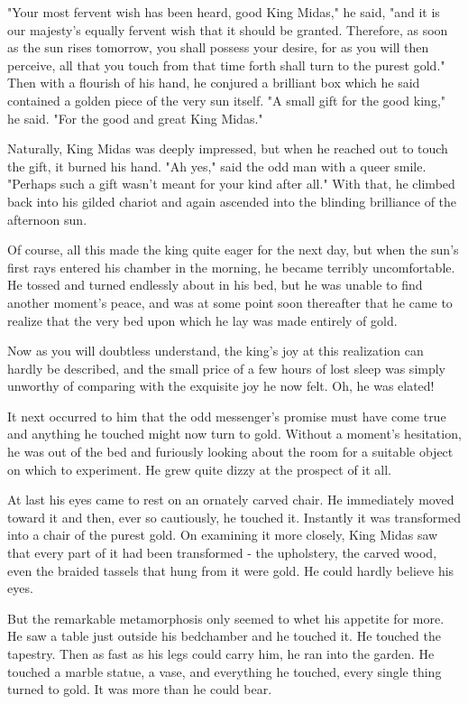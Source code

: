 "Your most fervent wish has been heard, good King Midas," he said, "and it is our majesty's equally fervent wish that it should be granted. Therefore, as soon as the sun rises tomorrow, you shall possess your desire, for as you will then perceive, all that you touch from that time forth shall turn to the purest gold." Then with a flourish of his hand, he conjured a brilliant box which he said contained a golden piece of the very sun itself. "A small gift for the good king," he said. "For the good and great King Midas."

Naturally, King Midas was deeply impressed, but when he reached out to touch the gift, it burned his hand. "Ah yes," said the odd man with a queer smile. "Perhaps such a gift wasn't meant for your kind after all." With that, he climbed back into his gilded chariot and again ascended into the blinding brilliance of the afternoon sun.

Of course, all this made the king quite eager for the next day, but when the sun's first rays entered his chamber in the morning, he became terribly uncomfortable. He tossed and turned endlessly about in his bed, but he was unable to find another moment's peace, and was at some point soon thereafter that he came to realize that the very bed upon which he lay was made entirely of gold.

Now as you will doubtless understand, the king's joy at this realization can hardly be described, and the small price of a few hours of lost sleep was simply unworthy of comparing with the exquisite joy he now felt. Oh, he was elated!

It next occurred to him that the odd messenger's promise must have come true and anything he touched might now turn to gold. Without a moment's hesitation, he was out of the bed and furiously looking about the room for a suitable object on which to experiment. He grew quite dizzy at the prospect of it all.

At last his eyes came to rest on an ornately carved chair. He immediately moved toward it and then, ever so cautiously, he touched it. Instantly it was transformed into a chair of the purest gold. On examining it more closely, King Midas saw that every part of it had been transformed - the upholstery, the carved wood, even the braided tassels that hung from it were gold. He could hardly believe his eyes.

But the remarkable metamorphosis only seemed to whet his appetite for more. He saw a table just outside his bedchamber and he touched it. He touched the tapestry. Then as fast as his legs could carry him, he ran into the garden. He touched a marble statue, a vase, and everything he touched, every single thing turned to gold. It was more than he could bear.


